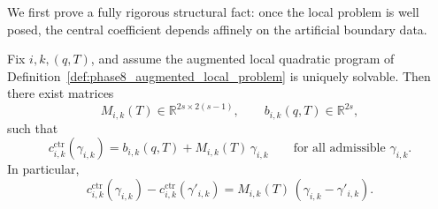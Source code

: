 We first prove a fully rigorous structural fact: once the local problem is well posed, the central coefficient depends affinely on the artificial boundary data.

\begin{proposition}
\label{prop:phase8_affine_boundary_response}
Fix \(i,k,(q,T)\), and assume the augmented local quadratic program of Definition~\ref{def:phase8_augmented_local_problem} is uniquely solvable.
Then there exist matrices
\[
M_{i,k}(T)\in\mathbb R^{2s\times 2(s-1)},
\qquad
b_{i,k}(q,T)\in\mathbb R^{2s},
\]
such that
\begin{equation}
\label{eq:phase8_affine_map}
c_{i,k}^{\mathrm{ctr}}(\gamma_{i,k})
=
b_{i,k}(q,T)+M_{i,k}(T)\,\gamma_{i,k}
\qquad
\text{for all admissible }\gamma_{i,k}.
\end{equation}
In particular,
\begin{equation}
\label{eq:phase8_c_diff_affine}
c_{i,k}^{\mathrm{ctr}}(\gamma_{i,k})
-
c_{i,k}^{\mathrm{ctr}}(\gamma'_{i,k})
=
M_{i,k}(T)\,(\gamma_{i,k}-\gamma'_{i,k}).
\end{equation}
\end{proposition}

